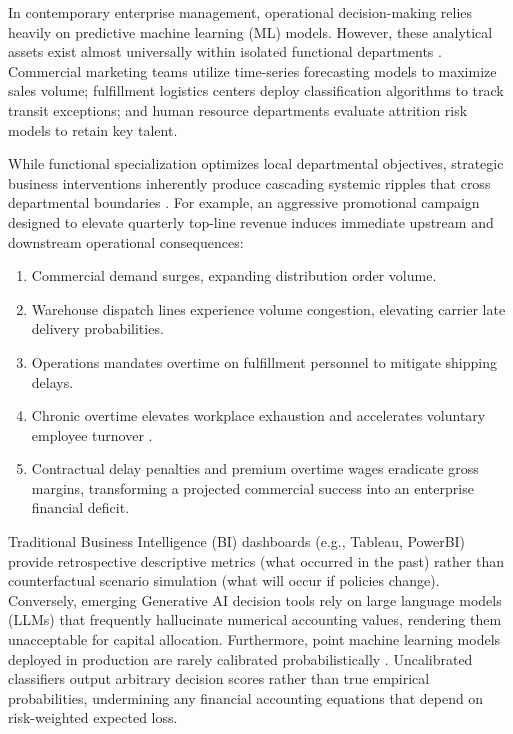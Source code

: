\documentclass[conference]{IEEEtran}
\begin{document}
In contemporary enterprise management, operational decision-making relies heavily on predictive machine learning (ML) models. However, these analytical assets exist almost universally within isolated functional departments \cite{pratt2019decision}. Commercial marketing teams utilize time-series forecasting models to maximize sales volume; fulfillment logistics centers deploy classification algorithms to track transit exceptions; and human resource departments evaluate attrition risk models to retain key talent.

While functional specialization optimizes local departmental objectives, strategic business interventions inherently produce cascading systemic ripples that cross departmental boundaries \cite{lee1997bullwhip}. For example, an aggressive promotional campaign designed to elevate quarterly top-line revenue induces immediate upstream and downstream operational consequences:
\begin{enumerate}
    \item Commercial demand surges, expanding distribution order volume.
    \item Warehouse dispatch lines experience volume congestion, elevating carrier late delivery probabilities.
    \item Operations mandates overtime on fulfillment personnel to mitigate shipping delays.
    \item Chronic overtime elevates workplace exhaustion and accelerates voluntary employee turnover \cite{maslach2001burnout}.
    \item Contractual delay penalties and premium overtime wages eradicate gross margins, transforming a projected commercial success into an enterprise financial deficit.
\end{enumerate}

Traditional Business Intelligence (BI) dashboards (e.g., Tableau, PowerBI) provide retrospective descriptive metrics (what occurred in the past) rather than counterfactual scenario simulation (what will occur if policies change). Conversely, emerging Generative AI decision tools rely on large language models (LLMs) that frequently hallucinate numerical accounting values, rendering them unacceptable for capital allocation. Furthermore, point machine learning models deployed in production are rarely calibrated probabilistically \cite{guo2017calibration}. Uncalibrated classifiers output arbitrary decision scores rather than true empirical probabilities, undermining any financial accounting equations that depend on risk-weighted expected loss.
\end{document}
